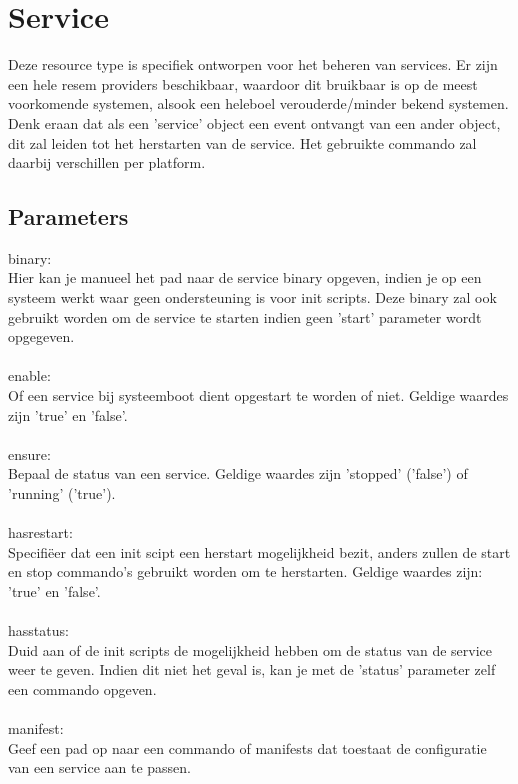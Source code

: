\section{Service}

Deze resource type is specifiek ontworpen voor het beheren van services. Er zijn een hele resem providers beschikbaar, waardoor dit bruikbaar is op de meest voorkomende systemen, alsook een heleboel verouderde/minder bekend systemen. Denk eraan dat als een 'service' object een event ontvangt van een ander object, dit zal leiden tot het herstarten van de service. Het gebruikte commando zal daarbij verschillen per platform.

\subsection{Parameters}
binary:\\
Hier kan je manueel het pad naar de service binary opgeven, indien je op een systeem werkt waar geen ondersteuning is voor init scripts. Deze binary zal ook gebruikt worden om de service te starten indien geen 'start' parameter wordt opgegeven.\\\\
%
enable:\\
Of een service bij systeemboot dient opgestart te worden of niet. Geldige waardes zijn 'true' en 'false'.\\\\
%
ensure:\\
Bepaal de status van een service. Geldige waardes zijn 'stopped' ('false') of 'running' ('true').\\\\
%
hasrestart:\\
Specifi\"eer dat een init scipt een herstart mogelijkheid bezit, anders zullen de start en stop commando's gebruikt worden om te herstarten. Geldige waardes zijn: 'true' en 'false'.\\\\
%
hasstatus:\\
Duid aan of de init scripts de mogelijkheid hebben om de status van de service weer te geven. Indien dit niet het geval is, kan je met de 'status' parameter zelf een commando opgeven.\\\\
%
manifest:\\
Geef een pad op naar een commando of manifests dat toestaat de configuratie van een service aan te passen.\\\\
